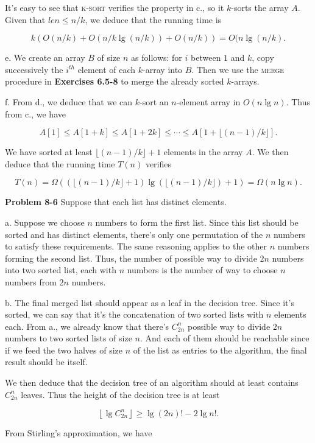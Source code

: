 \documentclass[a4paper,12pt]{article}
\newcommand{\newprob}[1]
{\bigskip \noindent \textbf{Problem #1} \newline}
\newcommand{\subpar}[1]{\medskip \noindent #1.}
\begin{document}
It's easy to see that \textsc{k-sort} verifies the property in c., so
it $k$-sorts the array $A$.  Given that $len \le  n/k$, we deduce that
the running time is

\[ k (O(n/k) + O(n/k \lg(n/k)) + O(n/k)) = O(n\lg(n/k).\]

\subpar{e} We create an array $B$ of size $n$ as follows: for $i$
between $1$ and $k$, copy successively the $i^{th}$ element of
each $k$-array into $B$.  Then we use the \textsc{merge} procedure in
\textbf{Exercises 6.5-8} to merge the already sorted $k$-arrays.

\subpar{f} From d., we deduce that we can $k$-sort an $n$-element array
in $O(n\lg n)$.  Thus from c., we have

\[ A[1] \le A[1+k] \le A[1+2k] \le \cdots \le A[1+\lfloor
  (n-1)/k\rfloor].\]

We have sorted at least $\lfloor (n-1)/k\rfloor + 1$ elements in the
array $A$.  We then deduce that the running time $T(n)$ verifies

\[ T(n) = \Omega((\lfloor(n-1)/k\rfloor+1) \lg(\lfloor(n-1)/k\rfloor)+1) =
\Omega(n \lg n).\]

\newprob{8-6}  Suppose that each list has distinct elements.

\subpar{a} Suppose we choose $n$ numbers to form the first list.
Since this list should be sorted and has distinct elements, there's
only one permutation of the $n$ numbers to satisfy these
requirements.  The same reasoning applies to the other $n$ numbers
forming the second list.  Thus, the number of possible way to divide
$2n$ numbers into two sorted list, each with $n$ numbers is the number
of way to choose $n$ numbers from $2n$ numbers.

\subpar{b} The final merged list should appear as a leaf in the
decision tree.  Since it's sorted, we can say that it's the
concatenation of two sorted lists with $n$ elements each.  From a., we
already know that there's $C_{2n}^n$ possible way to divide $2n$
numbers to two sorted lists of size $n$.  And each of them should be
reachable since if we feed the two halves of size $n$ of the list as
entries to the algorithm, the final result should be itself.

We then deduce that the decision tree of an algorithm should at least
contains $C_{2n}^n$ leaves.  Thus the height of the decision tree is
at least

\[  \left\lfloor \lg C_{2n}^n\right\rfloor \ge \lg (2n)! - 2 \lg n!.\]

From Stirling's approximation, we have
\end{document}
